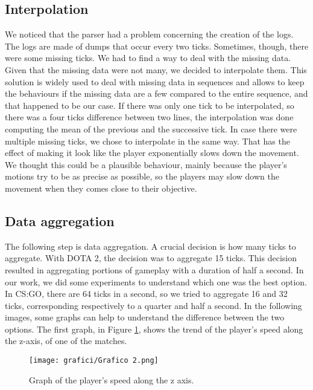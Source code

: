	\subsection{Interpolation}
		
		We noticed that the parser had a problem concerning the creation of the logs. 
		The logs are made of dumps that occur every two ticks. 
		Sometimes, though, there were some missing ticks.
		We had to find a way to deal with the missing data. 
		Given that the missing data were not many, we decided to interpolate them.
		This solution is widely used to deal with missing data in sequences and allows to keep the behaviours if the missing data are a few compared to the entire sequence, and that happened to be our case. 
		If there was only one tick to be interpolated, so there was a four ticks difference between two lines, the interpolation was done computing the mean of the previous and the successive tick. 
		In case there were multiple missing ticks, we chose to interpolate in the same way. 
		That has the effect of making it look like the player exponentially slows down the movement. 
		We thought this could be a plausible behaviour, mainly because the player's motions try to be as precise as possible, so the players may slow down the movement when they comes close to their objective.
	
	\subsection{Data aggregation}
		
		The following step is data aggregation. 
		A crucial decision is how many ticks to aggregate. 
		With DOTA 2, the decision was to aggregate 15 ticks. 
		This decision resulted in aggregating portions of gameplay with a duration of half a second. In our work, we did some experiments to understand which one was the best option. 
		In CS:GO, there are 64 ticks in a second, so we tried to aggregate 16 and 32 ticks, corresponding respectively to a quarter and half a second. 
		In the following images, some graphs can help to understand the difference between the two options. 
		The first graph, in Figure \ref{fig:gr0}, shows the trend of the player's speed along the z-axis, of one of the matches.
		
		\begin{figure}[!h] 
			\centering 
			\texttt{[image: grafici/Grafico 2.png]}
			\caption{\label{fig:gr0}Graph of the player's speed along the z axis.}
		\end{figure}
		
